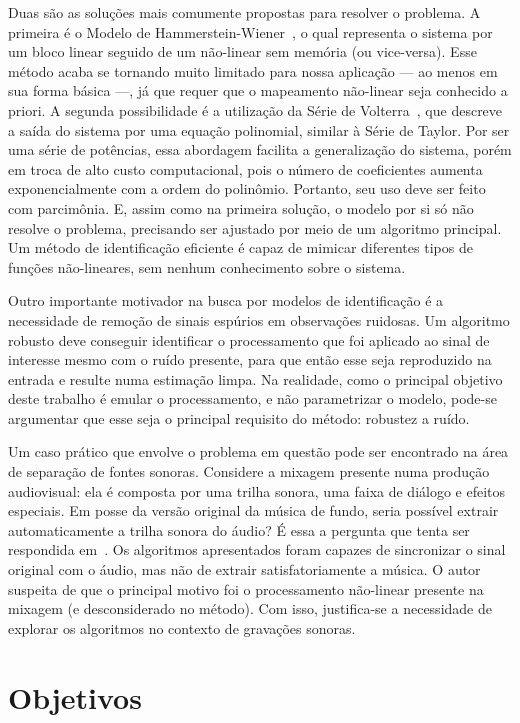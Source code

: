 Duas são as soluções mais comumente propostas para resolver o problema. A primeira é o Modelo de Hammerstein-Wiener~\cite{ogunfunmi-2007}, o qual representa o sistema por um bloco linear seguido de um não-linear sem memória (ou vice-versa). Esse método acaba se tornando muito limitado para nossa aplicação --- ao menos em sua forma básica ---, já que requer que o mapeamento não-linear seja conhecido a priori. A segunda possibilidade é a utilização da Série de Volterra~\cite{ogunfunmi-2007}, que descreve a saída do sistema por uma equação polinomial, similar à Série de Taylor. Por ser uma série de potências, essa abordagem facilita a generalização do sistema, porém em troca de alto custo computacional, pois o número de coeficientes aumenta exponencialmente com a ordem do polinômio. Portanto, seu uso deve ser feito com parcimônia. E, assim como na primeira solução, o modelo por si só não resolve o problema, precisando ser ajustado por meio de um algoritmo principal. Um método de identificação eficiente é capaz de mimicar diferentes tipos de funções não-lineares, sem nenhum conhecimento sobre o sistema.

Outro importante motivador na busca por modelos de identificação é a necessidade de remoção de sinais espúrios em observações ruidosas. Um algoritmo robusto deve conseguir identificar o processamento que foi aplicado ao sinal de interesse mesmo com o ruído presente, para que então esse seja reproduzido na entrada e resulte numa estimação limpa. Na realidade, como o principal objetivo deste trabalho é emular o processamento, e não parametrizar o modelo, pode-se argumentar que esse seja o principal requisito do método: robustez a ruído.

Um caso prático que envolve o problema em questão pode ser encontrado na área de separação de fontes sonoras. Considere a mixagem presente numa produção audiovisual: ela é composta por uma trilha sonora, uma faixa de diálogo e efeitos especiais. Em posse da versão original da música de fundo, seria possível extrair automaticamente a trilha sonora do áudio? É essa a pergunta que tenta ser respondida em~\cite{lordelo-2018}. Os algoritmos apresentados foram capazes de sincronizar o sinal original com o áudio, mas não de extrair satisfatoriamente a música. O autor suspeita de que o principal motivo foi o processamento não-linear presente na mixagem (e desconsiderado no método). Com isso, justifica-se a necessidade de explorar os algoritmos no contexto de gravações sonoras.

\section{Objetivos}

